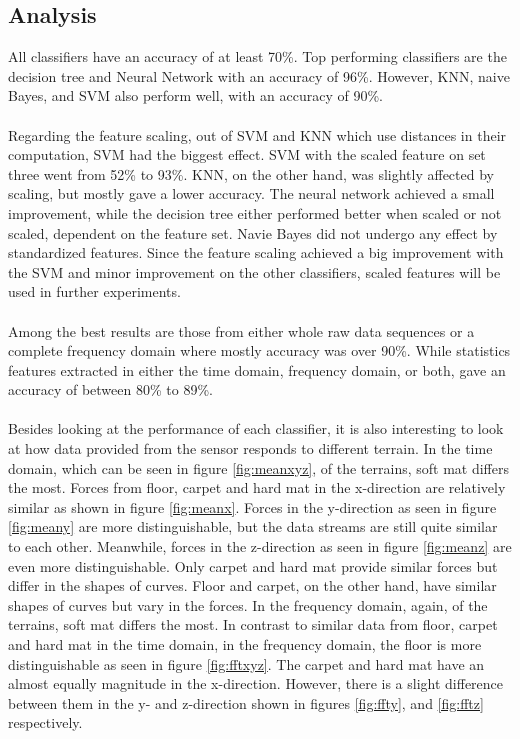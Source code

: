 \documentclass[USenglish]{ifimaster}  %
\begin{document}
\subsection{Analysis}
All classifiers have an accuracy of at least 70\%. Top performing classifiers are the decision tree and Neural Network with an accuracy of 96\%. However, KNN, naive Bayes, and SVM also perform well, with an accuracy of 90\%. 
\\
\\
Regarding the feature scaling, out of SVM and KNN which use distances in their computation, SVM had the biggest effect. SVM with the scaled feature on set three went from 52\% to 93\%. KNN, on the other hand, was slightly affected by scaling, but mostly gave a lower accuracy. The neural network achieved a small improvement, while the decision tree either performed better when scaled or not scaled, dependent on the feature set. Navie Bayes did not undergo any effect by standardized features. Since the feature scaling achieved a big improvement with the SVM and minor improvement on the other classifiers, scaled features will be used in further experiments.
\\
\\
Among the best results are those from either whole raw data sequences or a complete frequency domain where mostly accuracy was over 90\%. While statistics features extracted in either the time domain, frequency domain, or both, gave an accuracy of between 80\% to 89\%.
\\
\\
Besides looking at the performance of each classifier, it is also interesting to look at how data provided from the sensor responds to different terrain. In the time domain, which can be seen in figure \ref{fig:meanxyz}, of the terrains, soft mat differs the most. Forces from floor, carpet and hard mat in the x-direction are relatively similar as shown in figure \ref{fig:meanx}. Forces in the y-direction as seen in figure \ref{fig:meany} are more distinguishable, but the data streams are still quite similar to each other. Meanwhile, forces in the z-direction as seen in figure \ref{fig:meanz} are even more distinguishable. Only carpet and hard mat provide similar forces but differ in the shapes of curves. Floor and carpet, on the other hand, have similar shapes of curves but vary in the forces. In the frequency domain, again, of the terrains, soft mat differs the most. In contrast to similar data from floor, carpet and hard mat in the time domain, in the frequency domain, the floor is more distinguishable as seen in figure \ref{fig:fftxyz}. The carpet and hard mat have an almost equally magnitude in the x-direction. However, there is a slight difference between them in the y- and z-direction shown in figures \ref{fig:ffty}, and \ref{fig:fftz} respectively.
\end{document}
